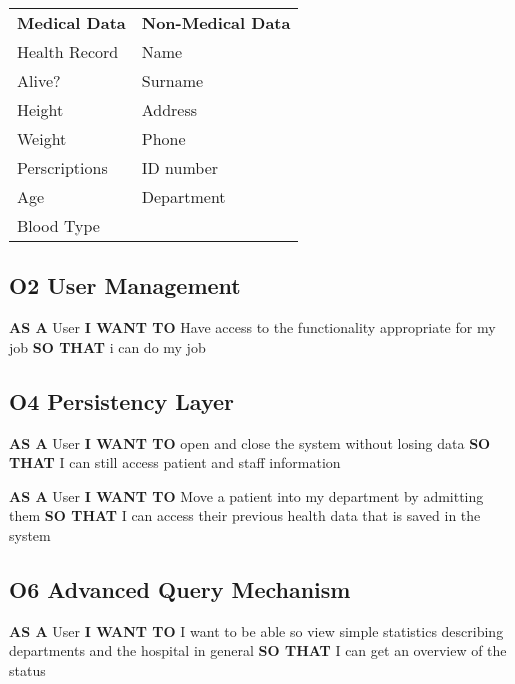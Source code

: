 \newpage
\begin{table}[]
\begin{tabular}{ll}
\textbf{Medical Data} & \textbf{Non-Medical Data} \\
Health Record         & Name                      \\
Alive?                & Surname                   \\
Height                & Address                   \\
Weight                & Phone                     \\
Perscriptions         & ID number                 \\
Age                   & Department                \\
Blood Type            &
\end{tabular}
\end{table}

\subsection*{O2 User Management}
\textbf{AS A} User\newline
\textbf{I WANT TO} Have access to the functionality appropriate for my job \newline
\textbf{SO THAT} i can do my job\newline

\subsection*{O4 Persistency Layer}

\textbf{AS A} User\newline
\textbf{I WANT TO} open and close the system without losing data\newline
\textbf{SO THAT} I can still access patient and staff information\newline

\textbf{AS A} User\newline
\textbf{I WANT TO} Move a patient into my department by admitting them\newline
\textbf{SO THAT} I can access their previous health data that is saved in the system\newline

\subsection*{O6 Advanced Query Mechanism}
\textbf{AS A} User\newline
\textbf{I WANT TO} I want to be able so view simple statistics describing departments and the hospital in general\newline
\textbf{SO THAT} I can get an overview of the status\newline
